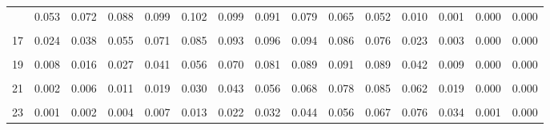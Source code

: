 \documentclass[
]{article}
\begin{document}
\begin{table}[!h]
{\begin{tabular}[t]{ccccccccccccccc}
\addlinespace
15 & 0.053 & 0.072 & 0.088 & 0.099 & 0.102 & 0.099 & 0.091 & 0.079 & 0.065 & 0.052 & 0.010 & 0.001 & 0.000 & 0.000\\
\cellcolor{gray!10}{16} & \cellcolor{gray!10}{0.037} & \cellcolor{gray!10}{0.054} & \cellcolor{gray!10}{0.072} & \cellcolor{gray!10}{0.087} & \cellcolor{gray!10}{0.096} & \cellcolor{gray!10}{0.099} & \cellcolor{gray!10}{0.096} & \cellcolor{gray!10}{0.088} & \cellcolor{gray!10}{0.077} & \cellcolor{gray!10}{0.065} & \cellcolor{gray!10}{0.015} & \cellcolor{gray!10}{0.002} & \cellcolor{gray!10}{0.000} & \cellcolor{gray!10}{0.000}\\
17 & 0.024 & 0.038 & 0.055 & 0.071 & 0.085 & 0.093 & 0.096 & 0.094 & 0.086 & 0.076 & 0.023 & 0.003 & 0.000 & 0.000\\
\cellcolor{gray!10}{18} & \cellcolor{gray!10}{0.015} & \cellcolor{gray!10}{0.026} & \cellcolor{gray!10}{0.040} & \cellcolor{gray!10}{0.055} & \cellcolor{gray!10}{0.071} & \cellcolor{gray!10}{0.083} & \cellcolor{gray!10}{0.091} & \cellcolor{gray!10}{0.094} & \cellcolor{gray!10}{0.091} & \cellcolor{gray!10}{0.084} & \cellcolor{gray!10}{0.032} & \cellcolor{gray!10}{0.006} & \cellcolor{gray!10}{0.000} & \cellcolor{gray!10}{0.000}\\
19 & 0.008 & 0.016 & 0.027 & 0.041 & 0.056 & 0.070 & 0.081 & 0.089 & 0.091 & 0.089 & 0.042 & 0.009 & 0.000 & 0.000\\
\addlinespace
\cellcolor{gray!10}{20} & \cellcolor{gray!10}{0.005} & \cellcolor{gray!10}{0.010} & \cellcolor{gray!10}{0.018} & \cellcolor{gray!10}{0.029} & \cellcolor{gray!10}{0.042} & \cellcolor{gray!10}{0.056} & \cellcolor{gray!10}{0.069} & \cellcolor{gray!10}{0.080} & \cellcolor{gray!10}{0.087} & \cellcolor{gray!10}{0.089} & \cellcolor{gray!10}{0.052} & \cellcolor{gray!10}{0.013} & \cellcolor{gray!10}{0.000} & \cellcolor{gray!10}{0.000}\\
21 & 0.002 & 0.006 & 0.011 & 0.019 & 0.030 & 0.043 & 0.056 & 0.068 & 0.078 & 0.085 & 0.062 & 0.019 & 0.000 & 0.000\\
\cellcolor{gray!10}{22} & \cellcolor{gray!10}{0.001} & \cellcolor{gray!10}{0.003} & \cellcolor{gray!10}{0.006} & \cellcolor{gray!10}{0.012} & \cellcolor{gray!10}{0.020} & \cellcolor{gray!10}{0.031} & \cellcolor{gray!10}{0.043} & \cellcolor{gray!10}{0.056} & \cellcolor{gray!10}{0.068} & \cellcolor{gray!10}{0.077} & \cellcolor{gray!10}{0.070} & \cellcolor{gray!10}{0.026} & \cellcolor{gray!10}{0.001} & \cellcolor{gray!10}{0.000}\\
23 & 0.001 & 0.002 & 0.004 & 0.007 & 0.013 & 0.022 & 0.032 & 0.044 & 0.056 & 0.067 & 0.076 & 0.034 & 0.001 & 0.000\\

\end{tabular}}
\end{table}
\end{document}

